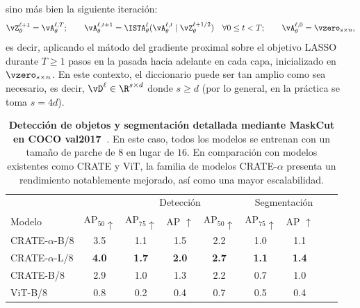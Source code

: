 \documentclass[../../book-main_es.tex]{subfiles}
\begin{document}
sino más bien la siguiente iteración:
\begin{equation}
\vZ_{\theta}^{\ell + 1} = \vA_{\theta}^{\ell, T}; \qquad
\vA_{\theta}^{\ell, t + 1} =
\ISTA_{\theta}^{\ell}(\vA_{\theta}^{\ell, t} \mid \vZ_{\theta}^{\ell
+ 1/2}) \quad \forall 0 \leq t < T; \qquad \vA_{\theta}^{\ell, 0} =
\vzero_{s \times n},
\end{equation}
es decir, aplicando el mátodo del gradiente proximal sobre el objetivo LASSO durante \(T \geq
1\) pasos en la pasada hacia adelante en cada capa, inicializado en
\(\vzero_{s \times n}\). En este contexto, el diccionario puede ser
tan amplio como sea necesario, es decir, \(\vD^{\ell} \in \R^{s \times d}\) donde \(s
\geq d\) (por lo general, en la práctica se toma \(s = 4d\)).

\begin{table}[b]
\caption{\small \textbf{Detección de objetos y segmentación detallada
mediante MaskCut en COCO val2017~\citep{lin2014microsoft}}.
En este caso, todos los modelos se entrenan con un tamaño de parche de \(8\) en lugar de \(16\).
En comparación con modelos existentes como CRATE y ViT, la
familia de modelos CRATE-\(\alpha\) presenta un rendimiento notablemente mejorado,
así como una mayor escalabilidad.}
\centering
\begin{tabular}{@{}lcccccccc@{}}
\toprule
&  & \multicolumn{3}{c}{Detección} &  \multicolumn{3}{c}{Segmentación} \\
Modelo & AP$_{50} \uparrow $ & AP$_{75} \uparrow $ & AP $\uparrow$ &
AP$_{50} \uparrow$ & AP$_{75} \uparrow $ & AP $\uparrow$ \\
\midrule
\midrule
CRATE-\(\alpha\)-B/8 & 3.5 & 1.1 & 1.5 & 2.2 & 1.0 & 1.1 \\
CRATE-\(\alpha\)-L/8 & \textbf{4.0} & \textbf{1.7} & \textbf{2.0} &
\textbf{2.7} & \textbf{1.1} & \textbf{1.4} \\
\midrule
\color{gray}CRATE-B/8 & \color{gray}2.9 & \color{gray}1.0 &
\color{gray}1.3 & \color{gray}2.2 & \color{gray}0.7 & \color{gray}1.0 \\
\color{gray}ViT-B/8 & \color{gray}0.8 & \color{gray}0.2 &
\color{gray}0.4 & \color{gray}0.7 & \color{gray}0.5 & \color{gray}0.4 \\
\bottomrule
\end{tabular}
\label{tab:crate_alpha_detection_segmentation}
\end{table}
\end{document}
